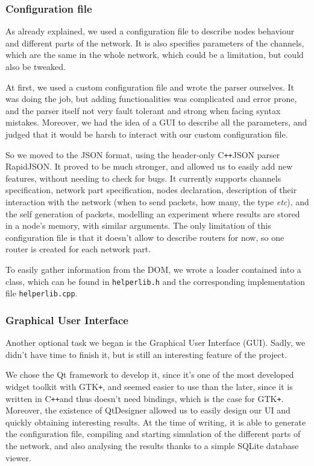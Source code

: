 \documentclass[12pt,a4paper]{article}
\newcommand{\Cpp}{C\texttt{++}}
\begin{document}
\subsubsection*{Configuration file}
As already explained, we used a configuration file to describe nodes behaviour and different parts of the network. It is also specifies parameters of the channels, which are the same in the whole network, which could be a limitation, but could also be tweaked.

At first, we used a custom configuration file and wrote the parser ourselves. It was doing the job, but adding functionalities was complicated and error prone, and the parser itself not very fault tolerant and strong when facing syntax mistakes. Moreover, we had the idea of a GUI to describe all the parameters, and judged that it would be harsh to interact with our custom configuration file.

So we moved to the JSON format, using the header-only \Cpp JSON parser RapidJSON. It proved to be much stronger, and allowed us to easily add new features, without needing to check for bugs. It currently supports channels specification, network part specification, nodes declaration, description of their interaction with the network (when to send packets, how many, the type \textsl{etc}), and the self generation of packets, modelling an experiment where results are stored in a node's memory, with similar arguments. The only limitation of this configuration file is that it doesn't allow to describe routers for now, so one router is created for each network part. 

To easily gather information from the DOM, we wrote a loader contained into a class, which can be found in \texttt{helperlib.h} and the corresponding implementation file \texttt{helperlib.cpp}.

\subsubsection*{Graphical User Interface}
Another optional task we began is the Graphical User Interface (GUI). Sadly, we didn't have time to finish it, but is still an interesting feature of the project.

We chose the Qt framework to develop it, since it's one of the most developed widget toolkit with GTK\texttt{+}, and seemed easier to use than the later, since it is written in \Cpp and thus doesn't need bindings, which is the case for GTK\texttt{+}. Moreover, the existence of QtDesigner allowed us to easily design our UI and quickly obtaining interesting results. At the time of writing, it is able to generate the configuration file, compiling and starting simulation of the different parts of the network, and also analysing the results thanks to a simple SQLite database viewer.
\end{document}
